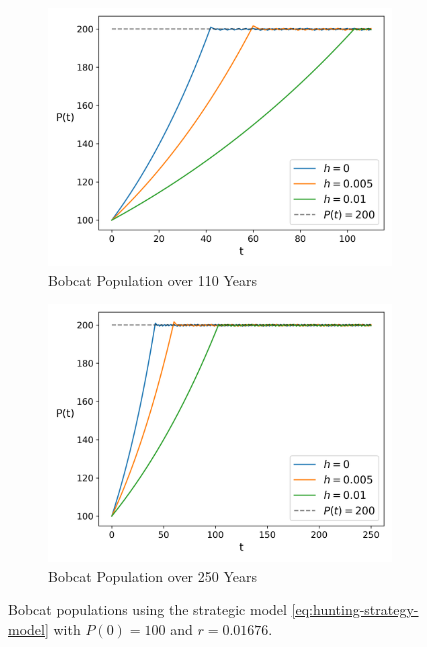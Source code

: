 \documentclass{article}
\begin{document}
\begin{figure}[h]
    \centering
    \begin{subfigure}{.5\textwidth}
        \centering
        \includegraphics[width=.95\linewidth]{./hunting_strategy/strategic_model_short_term.png}
        \caption{Bobcat Population over 110 Years}
        \label{fig:hunting-strategy-model-short-term}
    \end{subfigure}%
    \begin{subfigure}{.5\textwidth}
        \centering
        \includegraphics[width=.95\linewidth]{./hunting_strategy/strategic_model_long_term.png}
        \caption{Bobcat Population over 250 Years}
        \label{fig:hunting-strategy-model-long-term}
    \end{subfigure}
    \caption{Bobcat populations using the strategic model \cref{eq:hunting-strategy-model} with $P(0) = 100$ and $r = 0.01676$.}
    \label{fig:5}
\end{figure}
\end{document}
